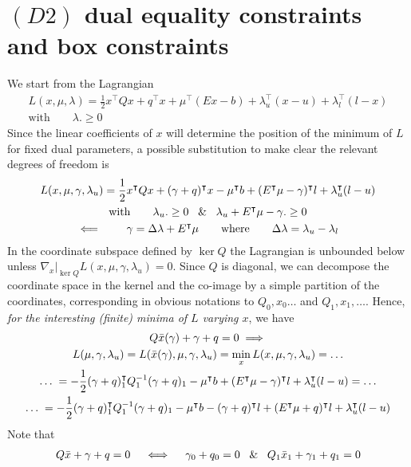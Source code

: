 \documentclass[twoside]{mfitjournal}
\begin{document}
\section*{$(D2)$ dual equality constraints and box constraints}
We start from the Lagrangian
    \begin{gather*}
    L(x, \mu, \lambda) = \frac{1}{2}x^\intercal Q x + q^\intercal x + \mu^\intercal(Ex - b) + \lambda_u^\intercal(x-u) + \lambda_l^\intercal(l-x) \\
    \textrm{with} \qquad \lambda .\ge 0
    \end{gather*}
Since the linear coefficients of $x$ will determine the position of the minimum of $L$ for fixed dual parameters, a possible substitution to make clear the relevant degrees of freedom is
    \begin{gather*}
    L(x, \mu, \gamma, \lambda_u) = \frac{1}{2}x^\intercal Q x + (\gamma + q)^\intercal x - \mu^\intercal b + (E^\intercal\mu - \gamma)^\intercal l + \lambda_u^\intercal(l-u) \\
    \textrm{with} \qquad \lambda_u .\ge 0 \; \And \; \lambda_u + E^\intercal\mu - \gamma .\ge 0 \\
    \impliedby \qquad
    \gamma = \Delta \lambda + E^\intercal \mu \qquad \textrm{where} \qquad \Delta \lambda = \lambda_u - \lambda_l
    \end{gather*}
In the coordinate subspace defined by $\ker Q$ the Lagrangian is unbounded below unless $\nabla_x|_{\ker Q} L(x, \mu, \gamma, \lambda_u) = 0$.
Since $Q$ is diagonal, we can decompose the coordinate space in the kernel and the co-image by a simple partition of the coordinates, corresponding in obvious notations to $Q_0, x_0 \dots$ and $Q_1, x_1, \dots$. Hence, \emph{for the interesting (finite) minima of $L$ varying $x$}, we have
    \begin{gather*}
    Q \Bar{x}(\gamma) + \gamma + q = 0 \implies \\
    L(\mu, \gamma, \lambda_u) = L(\Bar{x}(\gamma), \mu, \gamma, \lambda_u) = \min_x L(x, \mu, \gamma, \lambda_u) = \dots \\
    \dots \; = -\frac{1}{2}(\gamma + q)_1^\intercal Q_1^{-1} (\gamma + q)_1 - \mu^\intercal b + (E^\intercal\mu - \gamma)^\intercal l + \lambda_u^\intercal(l-u) = \dots \\
    \dots \; = -\frac{1}{2}(\gamma + q)_1^\intercal Q_1^{-1} (\gamma + q)_1 - \mu^\intercal b - (\gamma + q)^\intercal l + (E^\intercal\mu + q)^\intercal l + \lambda_u^\intercal(l-u)
    \end{gather*}
Note that
    \begin{gather*}
    Q \Bar{x} + \gamma + q = 0 \quad \iff \quad \gamma_0 + q_0 = 0 \; \And \; Q_1 \Bar{x}_1 + \gamma_1 + q_1 = 0
    \end{gather*}
\end{document}
